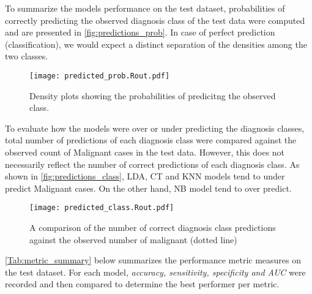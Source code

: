 \noindent To summarize the models performance on the test dataset, probabilities of correctly predicting the observed diagnosis class of the test data were computed and are presented in \autoref{fig:predictions_prob}. In case of perfect prediction (classification), we would expect a distinct separation of the densities among the two classes.
\noindent\begin{figure}[H]
    \centering
    \texttt{[image: predicted\_prob.Rout.pdf]}\vspace{-0.3cm}
    \caption{\small{Density plots showing the probabilities of predicitng the observed class.}}\label{fig:predictions_prob}
\end{figure}

\noindent To evaluate how the models were over or under predicting the diagnosis classes, total number of predictions of each diagnosis class were compared against the observed count of Malignant cases in the test data. However, this does not necessarily reflect the number of correct predictions of each diagnosis class. As shown in \autoref{fig:predictions_class}, LDA, CT and KNN models tend to under predict Malignant cases. On the other hand, NB model tend to over predict.
\noindent\begin{figure}[H]
    \centering
    \texttt{[image: predicted\_class.Rout.pdf]}\vspace{-0.3cm}
    \caption{\small{A comparison of the number of correct diagnosis class predictions against the observed number of malignant (dotted line) }}\label{fig:predictions_class}
\end{figure}

\noindent \autoref{Tab:metric_summary} below summarizes the performance metric measures on the test dataset. For each model, \textit{accuracy, sensitivity, specificity and AUC} were recorded and then compared to determine the best performer per metric.
\begin{table}[H]
\centering
\caption{\small{Model evaluation metrics on test dataset. \textit{Left:} metric scores for all the models; \textit{right:} best performing model for each metric.}}\vspace{-0.1cm}
\end{table}

